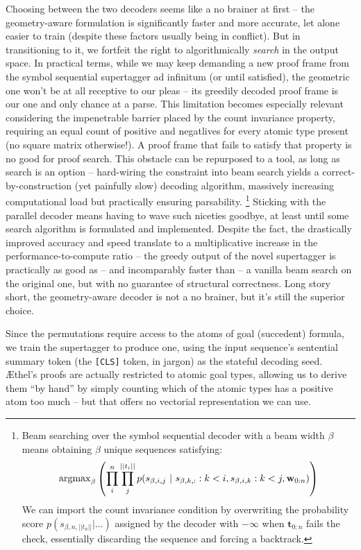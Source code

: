 Choosing between the two decoders seems like a no brainer at first -- the geometry-aware formulation is significantly faster and more accurate, let alone easier to train (despite these factors usually being in conflict).
But in transitioning to it, we fortfeit the right to algorithmically \textit{search} in the output space.
In practical terms, while we may keep demanding a new proof frame from the symbol sequential supertagger ad infinitum (or until satisfied), the geometric one won't be at all receptive to our pleas -- its greedily decoded proof frame is our one and only chance at a parse.
This limitation becomes especially relevant considering the impenetrable barrier placed by the count invariance property, requiring an equal count of positive and negatlives for every atomic type present (no square matrix otherwise!).
A proof frame that fails to satisfy that property is no good for proof search.
This obstacle can be repurposed to a tool, as long as search is an option -- hard-wiring the constraint into beam search yields a correct-by-construction (yet painfully slow) decoding algorithm, massively increasing computational load but practically ensuring parsability.%
	\footnote{
	Beam searching over the symbol sequential decoder with a beam width $\beta$ means obtaining $\beta$ unique sequences satisfying:
	\[
		\mathrm{argmax}_{\beta}\left(
		\prod_i^n \prod_j^{|| t_i ||} 
		p(s_{\beta, i, j} \ | \ 
			s_{\beta, k, :} : k < i,
			s_{\beta, i, k} : k < j,
			\wseq)
		\right)
	\]
	We can import the count invariance condition by overwriting the probability score $p(s_{\beta, n, ||t_n||} | \dots )$ assigned by the decoder with $-\infty$ when $\mathbf{t}_{0:n}$ fails the check, essentially discarding the sequence and forcing a backtrack.
}
Sticking with the parallel decoder means having to wave such niceties goodbye, at least until some search algorithm is formulated and implemented.
Despite the fact, the drastically improved accuracy and speed translate to a multiplicative increase in the performance-to-compute ratio -- the greedy output of the novel supertagger is practically as good as -- and incomparably faster than -- a vanilla beam search on the original one, but with no guarantee of structural correctness.
Long story short, the geometry-aware decoder is not a no brainer, but it's still the superior choice.

Since the permutations require access to the atoms of goal (succedent) formula, we train the supertagger to produce one, using the input sequence's sentential summary token (the \texttt{[CLS]} token, in jargon) as the stateful decoding seed.
\AE thel's proofs are actually restricted to atomic goal types, allowing us to derive them ``by hand'' by simply counting which of the atomic types has a positive atom too much -- but that offers no vectorial representation we can use.

